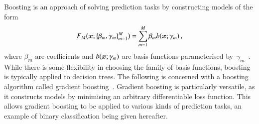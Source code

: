 Boosting is an approach of solving prediction tasks by constructing models of
the form
\begin{align*}
  F_{M}\bigl(\bm{x}; \{ \beta_m, \gamma_{m} \}_{m=1}^{M} \bigr) = \sum_{m = 1}^{M} \beta_m b(\bm{x}; \gamma_{m}) \,\text{,}
\end{align*}
where $\beta_m$ are coefficients and $b(\bm{x}; \gamma_{m})$ are basis
functions parameterised
by~$\gamma_{m}$~\cite{Friedman:2000,Friedman:2001wbq}. While there is some
flexibility in choosing the family of basis functions, boosting is typically
applied to decision trees.
The following is concerned with a boosting algorithm called gradient
boosting~\cite{Friedman:2001wbq}. Gradient boosting is particularly versatile,
as it constructs models by minimising an arbitrary differentiable loss function.
This allows gradient boosting to be applied to various kinds of prediction
tasks, an example of binary classification being given hereafter.


